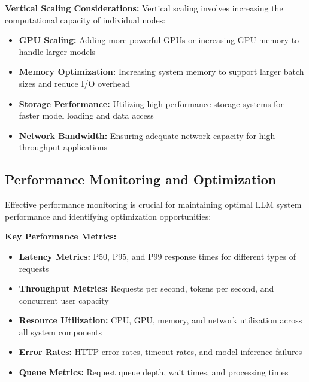 \textbf{Vertical Scaling Considerations:}
Vertical scaling involves increasing the computational capacity of individual nodes:

\begin{itemize}
    \item \textbf{GPU Scaling:} Adding more powerful GPUs or increasing GPU memory to handle larger models
    \item \textbf{Memory Optimization:} Increasing system memory to support larger batch sizes and reduce I/O overhead
    \item \textbf{Storage Performance:} Utilizing high-performance storage systems for faster model loading and data access
    \item \textbf{Network Bandwidth:} Ensuring adequate network capacity for high-throughput applications
\end{itemize}


\subsection{Performance Monitoring and Optimization}

Effective performance monitoring is crucial for maintaining optimal LLM system performance and identifying optimization opportunities:

\textbf{Key Performance Metrics:}
\begin{itemize}
    \item \textbf{Latency Metrics:} P50, P95, and P99 response times for different types of requests
    \item \textbf{Throughput Metrics:} Requests per second, tokens per second, and concurrent user capacity
    \item \textbf{Resource Utilization:} CPU, GPU, memory, and network utilization across all system components
    \item \textbf{Error Rates:} HTTP error rates, timeout rates, and model inference failures
    \item \textbf{Queue Metrics:} Request queue depth, wait times, and processing times
\end{itemize}

